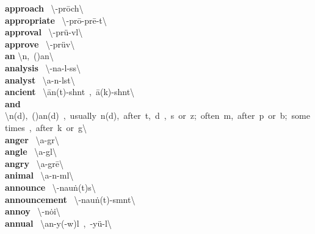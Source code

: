 \documentclass[10pt,a4paper]{article}
\begin{document}
\begin{multicols}{2}
\textbf{ approach }\quad \ \textbackslash \textschwa -\textprimstress pr\={o}ch\textbackslash \\
\textbf{ appropriate }\quad \ \textbackslash \textschwa -\textprimstress pr\={o}-pr\={e}-\textschwa t\textbackslash \\
\textbf{ approval }\quad \ \textbackslash \textschwa -\textprimstress pr\"{u}-v\textschwa l\textbackslash \\
\textbf{ approve }\quad \ \textbackslash \textschwa -\textprimstress pr\"{u}v\textbackslash \\
\textbf{ an }\quad \textbackslash \textschwa n,\ (\textprimstress )an\textbackslash \\
\textbf{ analysis }\quad \ \textbackslash \textschwa -\textprimstress na-l\textschwa -s\textschwa s\textbackslash \\
\textbf{ analyst }\quad \ \textbackslash \textprimstress a-n\textschwa -l\textschwa st\textbackslash \\
\textbf{ ancient }\quad \ \textbackslash \textprimstress \={a}n(t)-sh\textschwa nt\ ,\ \textprimstress \={a}\engma (k)-sh\textschwa nt\textbackslash \\
\textbf{ and }\quad \textbackslash \textschwa n(d),\ (\textprimstress )an(d)\ ,\ usually\ \textsuperscript{\textreve}n(d),\ after\ t,\ d\ ,\ s\ or\ z;\ often\ \textsuperscript{\textreve}m,\ after\ p\ or\ b;\ sometimes\ \textsuperscript{\textreve}\engma ,\ after\ k\ or\ g\textbackslash \\
\textbf{ anger }\quad \ \textbackslash \textprimstress a\engma -g\textschwa r\textbackslash \\
\textbf{ angle }\quad \ \textbackslash \textprimstress a\engma -g\textschwa l\textbackslash \\
\textbf{ angry }\quad \ \textbackslash \textprimstress a\engma -gr\={e}\textbackslash \\
\textbf{ animal }\quad \ \textbackslash \textprimstress a-n\textschwa -m\textschwa l\textbackslash \\
\textbf{ announce }\quad \ \textbackslash \textschwa -\textprimstress nau\. n(t)s\textbackslash \\
\textbf{ announcement }\quad \ \textbackslash \textschwa -\textprimstress nau\. n(t)-sm\textschwa nt\textbackslash \\
\textbf{ annoy }\quad \ \textbackslash \textschwa -\textprimstress n\.{o}i\textbackslash \\
\textbf{ annual }\quad \ \textbackslash \textprimstress an-y\textschwa (-w\textschwa )l\ ,\ -y\"{u}-\textschwa l\textbackslash \\

\end{multicols}
\end{document}
